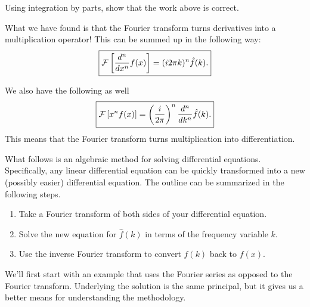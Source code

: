 \begin{exercise}
	Using integration by parts, show that the work above is correct. 
\end{exercise}

What we have found is that the Fourier transform turns derivatives into a multiplication operator! This can be summed up in the following way:
\[
\boxed{\mathcal{F}\left[ \frac{d^n}{dx^n} f(x) \right] = (i2\pi k)^n \hat{f}(k).}
\]

We also have the following as well
\[
\boxed{\mathcal{F}\left[ x^n f(x) \right] = \left(\frac{i}{2\pi}\right)^n \frac{d^n}{dk^n} \hat{f}(k).}
\]
This means that the Fourier transform turns multiplication into differentiation.  

What follows is an algebraic method for solving differential equations. Specifically, any linear differential equation can be quickly transformed into a new (possibly easier) differential equation. The outline can be summarized in the following steps.
\begin{enumerate}[1.]
	\item Take a Fourier transform of both sides of your differential equation.
	\item Solve the new equation for $\hat{f}(k)$ in terms of the frequency variable $k$.
	\item Use the inverse Fourier transform to convert $\hat{f}(k)$ back to $f(x)$.
\end{enumerate}

We'll first start with an example that uses the Fourier series as opposed to the Fourier transform.  Underlying the solution is the same principal, but it gives us a better means for understanding the methodology.

